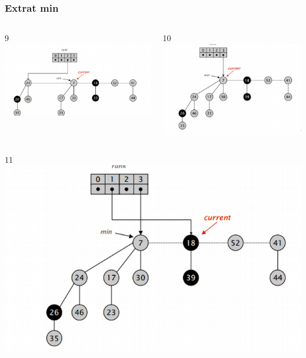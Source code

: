 \documentclass{beamer}
\begin{document}
 \begin{frame}
 \frametitle{Extrat min}
 \begin{columns}[t]
 9
    \includegraphics[width =0.9 \textwidth]{imagenes/delete9.png}
      
    10
    \includegraphics[width =0.9 \textwidth]{imagenes/delete10.png}

   \end{columns}
   \begin{columns}[t]
   11
    \includegraphics[width =0.9 \textwidth]{imagenes/delete11.png}
      

\end{columns}
\end{frame}
\end{document}
